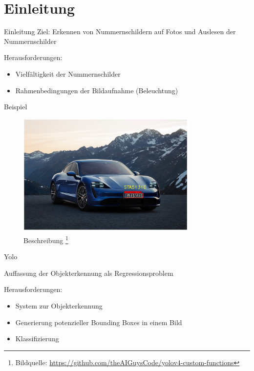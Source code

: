 \section{Einleitung}

\begin{frame}{Einleitung}
    Ziel: Erkennen von Nummernschildern auf Fotos und Auslesen der Nummernschilder
    
    Herausforderungen:
    \begin{itemize}
        \item Vielfältigkeit der Nummernschilder
        \item Rahmenbedingungen der Bildaufnahme (Beleuchtung)
    \end{itemize}
\end{frame}

\begin{frame}{Beispiel}
  \begin{figure}
    \begin{center}
      \includegraphics[width=0.8\textwidth]{bilder/Bild2}
      \caption{Beschreibung
      \footnote{Bildquelle: \url{https://github.com/theAIGuysCode/yolov4-custom-functions}}}
    \end{center}
  \end{figure}
\end{frame}

\begin{frame}{Yolo}
    
    Auffassung der Objekterkennung als Regressionsproblem 
    
    Herausforderungen:
    \begin{itemize}
        \item System zur Objekterkennung 
        \item Generierung potenzieller Bounding Boxes in einem Bild
        \item Klassifizierung
    \end{itemize}
\end{frame}